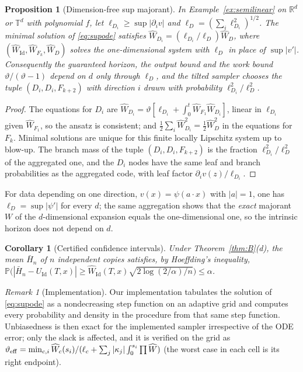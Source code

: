 \documentclass[11pt]{article}
\newtheorem{proposition}[theorem]{Proposition}
\newtheorem{corollary}[theorem]{Corollary}
\theoremstyle{definition}
\theoremstyle{remark}
\newtheorem{remark}[theorem]{Remark}
\newcommand{\R}{\mathbb{R}}
\renewcommand{\P}{\mathbb{P}}
\newcommand{\T}{\mathbb{T}}
\newcommand{\Id}{\mathrm{Id}}
\newcommand{\Wh}{\widehat W}
\begin{document}
\begin{proposition}[Dimension-free sup majorant]\label{prop:dimfree}
In Example~\ref{ex:semilinear} on $\R^d$ or $\T^d$ with polynomial $f$,
let $\ell_{D_i}\ge\sup|\partial_iv|$ and $\ell_D=(\sum_i\ell_{D_i}^2)^{1/2}$.
The minimal solution of \eqref{eq:supode} satisfies
$\Wh_{D_i}=(\ell_{D_i}/\ell_D)\Wh_D$, where $(\Wh_\Id,\Wh_{F_k},\Wh_D)$
solves the one-dimensional system with $\ell_D$ in place of
$\sup|v'|$. Consequently the guaranteed horizon, the output bound and
the work bound $\vartheta/(\vartheta-1)$ depend on $d$ only through
$\ell_D$, and the tilted sampler chooses the tuple $(D_i,D_i,F_{k+2})$
with direction $i$ drawn with probability $\ell_{D_i}^2/\ell_D^2$.
\end{proposition}
\begin{proof}
The equations for $D_i$ are $\Wh_{D_i}=\vartheta[\ell_{D_i}+\int_0^t
\Wh_{F_1}\Wh_{D_i}]$, linear in $\ell_{D_i}$ given $\Wh_{F_1}$, so the
ansatz is consistent; and $\frac12\sum_i\Wh_{D_i}^2=\frac12\Wh_D^2$ in
the equations for $F_k$. Minimal solutions are unique for this finite
locally Lipschitz system up to blow-up. The branch mass of the tuple
$(D_i,D_i,F_{k+2})$ is the fraction $\ell_{D_i}^2/\ell_D^2$ of the
aggregated one, and the $D_i$ nodes have the same leaf and branch
probabilities as the aggregated code, with leaf factor
$\partial_iv(z)/\ell_{D_i}$.
\end{proof}

For data depending on one direction, $v(x)=\psi(a\cdot x)$ with $|a|=1$,
one has $\ell_D=\sup|\psi'|$ for every $d$; the same aggregation shows that
the \emph{exact} majorant $W$ of the $d$-dimensional expansion equals the
one-dimensional one, so the intrinsic horizon does not depend on $d$.

\begin{corollary}[Certified confidence intervals]\label{cor:hoeffding}
Under Theorem~\ref{thm:B}(d), the mean $\bar H_n$ of $n$ independent
copies satisfies, by Hoeffding's inequality,
$\P\big(|\bar H_n-U_\Id(T,x)|\ge\Wh_\Id(T,x)\sqrt{2\log(2/\alpha)/n}\big)\le\alpha$.
\end{corollary}

\begin{remark}[Implementation]\label{rem:impl}
Our implementation tabulates the solution of \eqref{eq:supode} as a
nondecreasing step function on an adaptive grid and computes every
probability and density in the procedure from that same step function.
Unbiasedness is then exact for the implemented sampler irrespective of the
ODE error; only the slack is affected, and it is verified on the grid as
$\vartheta_{\rm eff}=\min_{c,i}\Wh_c(s_i)/(\ell_c+\sum_j|\kappa_j|\int_0^{s_i}\prod\Wh)$
(the worst case in each cell is its right endpoint).
\end{remark}
\end{document}
